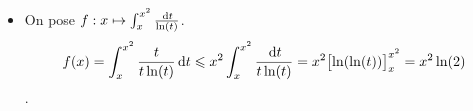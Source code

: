 \begin{itemize}
    \item On pose $f:x \mapsto \int_{x}^{x^2} \frac{\, \mathrm{d} t}{\ln (t)}$.
    $$\displaystyle f(x) = \int_{x}^{x^2} \frac{t}{t \ln (t)} \, \mathrm{d} t \leqslant x^2 \int_{x}^{x^2} \frac{\, \mathrm{d} t}{t \ln(t)} = x^2 \bigl[ \ln (\ln (t)) \bigr]_x^{x^2} = x^2 \ln(2)$$.
\end{itemize}